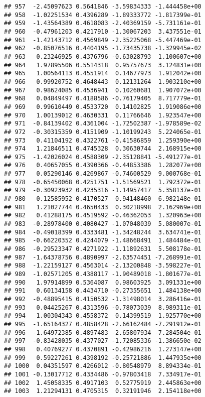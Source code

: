 \documentclass[
]{article}
\begin{document}
\begin{verbatim}
## 957  -2.45097623 0.5641846 -3.59834333 -1.444458e+00
## 958  -1.02251534 0.4396289 -1.89333772 -1.817399e-01
## 959  -1.43564389 0.4618083 -2.40369159 -5.731161e-01
## 960  -0.47961203 0.4217910 -1.30067203  3.437551e-01
## 961  -1.42143712 0.4569849 -2.35225068 -5.447469e-01
## 962  -0.85076516 0.4404195 -1.73435738 -1.329945e-02
## 963   0.23246925 0.4376796 -0.63028793  1.100607e+00
## 964   1.97895506 0.5514318  0.95757673  3.124831e+00
## 965   1.00564113 0.4551914  0.14677973  1.912042e+00
## 966   0.99920752 0.4648443  0.12131264  1.903210e+00
## 967   0.98624085 0.4536941  0.10260681  1.907072e+00
## 968   0.04849497 0.4188586 -0.76179405  8.717779e-01
## 969   0.99610449 0.4533720  0.14102825  1.919086e+00
## 970   1.00139012 0.4630331  0.11766646  1.923547e+00
## 971  -0.84139402 0.4361004 -1.72502387 -1.978589e-02
## 972  -0.30315359 0.4151909 -1.10199243  5.224065e-01
## 973   0.41104192 0.4322761 -0.41586859  1.259390e+00
## 974   1.21846511 0.4745328  0.30630744  2.168915e+00
## 975  -1.42026024 0.4588309 -2.35128841 -5.491277e-01
## 976   0.40657055 0.4390366 -0.44853386  1.282077e+00
## 977   0.05290146 0.4269867 -0.74600529  9.000768e-01
## 978  -0.65450068 0.4251751 -1.51569521  1.792372e-01
## 979  -0.30923932 0.4235316 -1.14957417  5.358137e-01
## 980  -0.12585952 0.4170527 -0.94148460  6.982148e-01
## 981   1.21027744 0.4650433  0.30218998  2.162969e+00
## 982   0.41288175 0.4519592 -0.46362053  1.320963e+00
## 983  -0.28978400 0.4080427 -1.07048039  5.080007e-01
## 984  -0.49018399 0.4333481 -1.34248244  3.634741e-01
## 985  -0.66220352 0.4244079 -1.48668491  1.484484e-01
## 986  -0.29523347 0.4271922 -1.11892631  5.508178e-01
## 987  -1.64378756 0.4890997 -2.63574451 -7.268991e-01
## 988  -1.22159127 0.4563014 -2.13200848 -3.598227e-01
## 989  -1.02571205 0.4388117 -1.90489018 -1.801677e-01
## 990   1.97914899 0.5364087  0.98603925  3.091331e+00
## 991   0.60134158 0.4434710 -0.27355651  1.484138e+00
## 992  -0.48895415 0.4150532 -1.31498014  3.286416e-01
## 993   0.04425267 0.4313596 -0.78073039  8.989311e-01
## 994   1.00304343 0.4558372  0.14399519  1.925770e+00
## 995  -1.65164327 0.4858428 -2.66162484 -7.291912e-01
## 996  -1.64972385 0.4897483 -2.65807934 -7.284504e-01
## 997  -0.83428035 0.4377027 -1.72085336 -1.386650e-02
## 998   0.40769277 0.4370891 -0.42986216  1.273147e+00
## 999   0.59227261 0.4398192 -0.25721886  1.447935e+00
## 1000  0.04351597 0.4266012 -0.80548979  8.894334e-01
## 1001 -0.13017712 0.4334486 -0.97803418  7.334917e-01
## 1002  1.45058335 0.4917103  0.52775919  2.445863e+00
## 1003  1.21294131 0.4705315  0.32191946  2.154118e+00

\end{verbatim}
\end{document}
